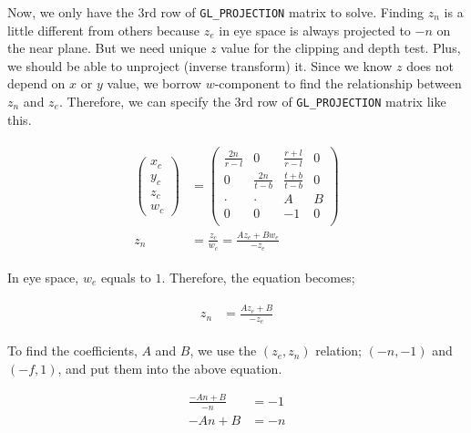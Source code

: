 Now, we only have the 3rd row of \verb|GL_PROJECTION| matrix to solve. Finding $z_n$ is a little different from others because $z_e$ in eye space is always projected to $-n$ on the near plane. But we need unique $z$ value for the clipping and depth test. Plus, we should be able to unproject (inverse transform) it. Since we know $z$ does not depend on $x$ or $y$ value, we borrow $w$-component to find the relationship between $z_n$ and $z_e$. Therefore, we can specify the 3rd row of \verb|GL_PROJECTION| matrix like this. 

\begin{equation}
\begin{aligned}
\begin{split}
\begin{pmatrix} x_{c}\\y_{c}\\z_{c}\\w_{c} \end{pmatrix} &= 
\begin{pmatrix} 
\frac{2n}{r-l} & 0 & \frac{r+l}{r-l} & 0 \\
0 & \frac{2n}{t-b} & \frac{t+b}{t-b} & 0 \\
\cdot & \cdot & A & B \\
0 & 0 & -1 & 0 \\
\end{pmatrix} \\
z_n &= \frac{z_c}{w_c}= \frac{Az_e+Bw_e}{-z_e}
\end{split}
\end{aligned}
\label{eq.zn}
\end{equation}

In eye space, $w_e$ equals to $1$. Therefore, the equation becomes; 

\begin{equation}
\begin{aligned}
\begin{split}
    z_n &= \frac{Az_e+B}{-z_e}
\end{split}    
\end{aligned}
\label{eq.znreduced}
\end{equation}


To find the coefficients, $A$ and $B$, we use the $(z_e, z_n)$ relation; $(-n, -1)$ and $(-f, 1)$, and put them into the above equation. 

\begin{equation}
\begin{aligned}
    \frac{-An+B}{-n} &= -1 \\
    -An+B &= -n
\end{aligned}
\label{eq.near}
\end{equation}

